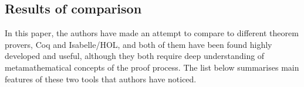 \documentclass[article]{aaltoseries}
\begin{document}





\subsection{Results of comparison}
\label{sec:joint_comparison}

In this paper, the authors have made an attempt to compare to different theorem provers, Coq and Isabelle/HOL, and both of them have been found highly developed and useful, although they both require deep understanding of metamathematical concepts of the proof process. The list below summarises main features of these two tools that authors have noticed.
\end{document}
